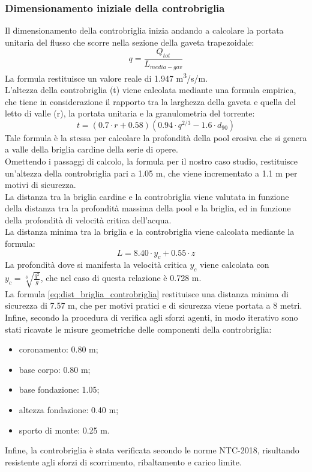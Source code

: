 \subsubsection{Dimensionamento iniziale della controbriglia}
Il dimensionamento della controbriglia inizia andando a calcolare la portata unitaria del flusso che scorre nella sezione della gaveta trapezoidale:
\begin{equation}
    q = \frac{Q_{tot}}{L_{media-gav}}
\end{equation}
La formula restituisce un valore reale di 1.947 \unit{m^3/s/m}.\\
L'altezza della controbriglia (t) viene calcolata mediante una formula empirica, che tiene in considerazione il rapporto tra la larghezza della gaveta e quella del letto di valle (r), la portata unitaria e la granulometria del torrente:
\begin{equation}
    t= (0.7 \cdot r+0.58)(0.94 \cdot q^{2/3} - 1.6 \cdot d_{90})
\end{equation}
Tale formula è la stessa per calcolare la profondità della pool erosiva che si genera a valle della briglia cardine della serie di opere.\\
Omettendo i passaggi di calcolo, la formula per il nostro caso studio, restituisce un'altezza della controbriglia pari a 1.05 m, che viene incrementato a 1.1 m per motivi di sicurezza.\\
La distanza tra la briglia cardine e la controbriglia viene valutata in funzione della distanza tra la profondità massima della pool e la briglia, ed in funzione della profondità di velocità critica dell'acqua.\\
La distanza minima tra la briglia e la controbriglia viene calcolata mediante la formula:
\begin{equation}
    L= 8.40 \cdot y_c + 0.55 \cdot z
    \label{eq:dist_briglia_controbriglia}
\end{equation}
La profondità dove si manifesta la velocità critica $y_c$ viene calcolata con $y_c = \sqrt[3]{\frac{q^2}{g}}$, che nel caso di questa relazione è 0.728 m.\\
La formula \eqref{eq:dist_briglia_controbriglia} restituisce una distanza minima di sicurezza di 7.57 m, che per motivi pratici e di sicurezza viene portata a 8 metri.\\
Infine, secondo la procedura di verifica agli sforzi agenti, in modo iterativo sono stati ricavate le misure geometriche delle componenti della controbriglia:
\begin{itemize}
    \item coronamento: 0.80 m;
    \item base corpo: 0.80 m;
    \item base fondazione: 1.05;
    \item altezza fondazione: 0.40 m;
    \item sporto di monte: 0.25 m.
\end{itemize}
Infine, la controbriglia è stata verificata secondo le norme NTC-2018, risultando resistente agli sforzi di scorrimento, ribaltamento e carico limite.